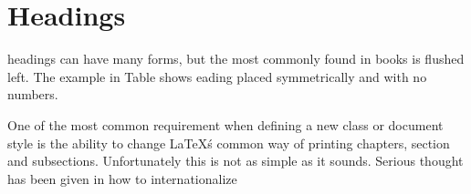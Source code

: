 \section{Headings}

headings can have many forms, but the most commonly found in books is flushed left. The example in Table shows eading 
placed symmetrically and with no numbers.


\begin{figure}[htbp]
 


\end{figure}


One of the most common requirement when defining a new class or document style
is the ability to change \LaTeX\'s common way of printing chapters, section and subsections.
Unfortunately this is not as simple as it sounds. Serious thought has been given in how to internationalize \latex\:

